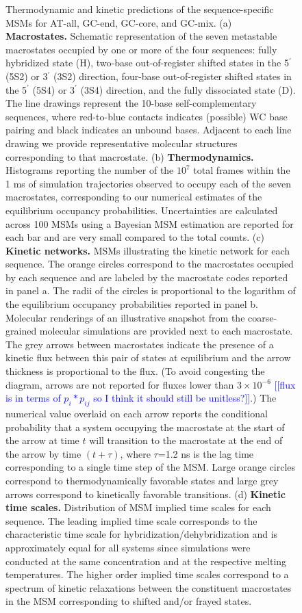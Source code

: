 \documentclass[journal=jpcbfk,manuscript=article]{achemso}
\newcommand*{\noteb}[1]{\textcolor{blue}{[[#1]]}}		%
\begin{document}
\begin{figure}[ht!]
        \caption{Thermodynamic and kinetic predictions of the sequence-specific MSMs for AT-all, GC-end, GC-core, and GC-mix. (a) \textbf{Macrostates.} Schematic representation of the seven metastable macrostates occupied by one or more of the four sequences: fully hybridized state (H), two-base out-of-register shifted states in the 5$^\prime$ (5S2) or 3$^\prime$ (3S2) direction, four-base out-of-register shifted states in the 5$^\prime$ (5S4) or 3$^\prime$ (3S4) direction, and the fully dissociated state (D). The line drawings represent the 10-base self-complementary sequences, where red-to-blue contacts indicates (possible) WC base pairing and black indicates an unbound bases. Adjacent to each line drawing we provide representative molecular structures corresponding to that macrostate. (b) \textbf{Thermodynamics.} Histograms reporting the number of the $10^7$ total frames within the 1 ms of simulation trajectories observed to occupy each of the seven macrostates, corresponding to our numerical estimates of the equilibrium occupancy probabilities. Uncertainties are calculated across 100 MSMs using a Bayesian MSM estimation are reported for each bar and are very small compared to the total counts. (c) \textbf{Kinetic networks.} MSMs illustrating the kinetic network for each sequence. The orange circles correspond to the macrostates occupied by each sequence and are labeled by the macrostate codes reported in panel a. The radii of the circles is proportional to the logarithm of the equilibrium occupancy probabilities reported in panel b. Molecular renderings of an illustrative snapshot from the coarse-grained molecular simulations are provided next to each macrostate. The grey arrows between macrostates indicate the presence of a kinetic flux between this pair of states at equilibrium and the arrow thickness is proportional to the flux. (To avoid congesting the diagram, arrows are not reported for fluxes lower than $3\times10^{-6}$ \noteb{flux is in terms of $p_i*p_{ij}$ so I think it should still be unitless?}.) The numerical value overlaid on each arrow reports the conditional probability that a system occupying the macrostate at the start of the arrow at time $t$ will transition to the macrostate at the end of the arrow by time $(t+\tau)$, where $\tau$=1.2 ns is the lag time corresponding to a single time step of the MSM. Large orange circles correspond to thermodynamically favorable states and large grey arrows correspond to kinetically favorable transitions. (d) \textbf{Kinetic time scales.} Distribution of MSM implied time scales for each sequence. The leading implied time scale corresponds to the characteristic time scale for hybridization/dehybridization and is approximately equal for all systems since simulations were conducted at the same concentration and at the respective melting temperatures. The higher order implied time scales correspond to a spectrum of kinetic relaxations between the constituent macrostates in the MSM corresponding to shifted and/or frayed states.
    }
    \label{fig:allseq_table}
\end{figure}
\end{document}
